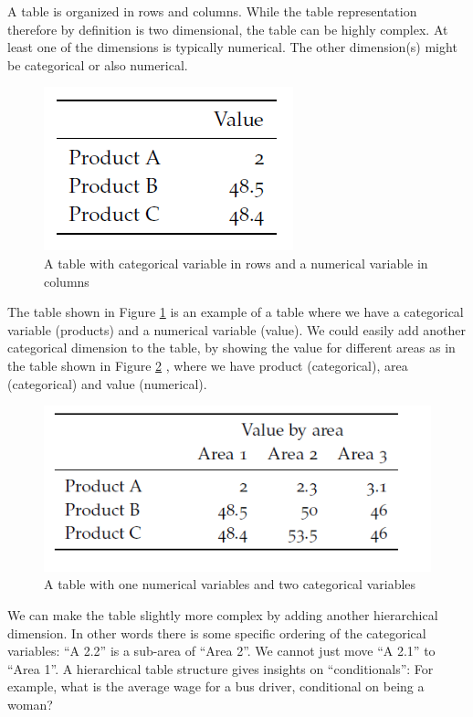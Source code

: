 \documentclass[]{book}
\begin{document}
A table is organized in rows and columns. While the table representation therefore by definition is two dimensional, the table can be highly complex. At least one of the dimensions is typically numerical. The other dimension(s) might be categorical or also numerical.

\begin{figure}

{\centering \includegraphics[width=0.3\linewidth]{_resources/chapter_viz/tab1} 

}

\caption{A table with categorical variable in rows and a numerical variable in columns}\label{fig:viz5}
\end{figure}

The table shown in Figure \ref{fig:viz5} is an example of a table where we have a categorical variable (products) and a numerical variable (value). We could easily add another categorical dimension to the table, by showing the value for different areas as in the table shown in Figure \ref{fig:viz6} , where we have product (categorical), area (categorical) and value (numerical).

\begin{figure}

{\centering \includegraphics[width=0.6\linewidth]{_resources/chapter_viz/tab2} 

}

\caption{A table with one numerical variables and two categorical variables}\label{fig:viz6}
\end{figure}

We can make the table slightly more complex by adding another hierarchical dimension. In other words there is some specific ordering of the categorical variables: ``A 2.2'' is a sub-area of ``Area 2''. We cannot just move ``A 2.1'' to ``Area 1''. A hierarchical table structure gives insights on ``conditionals'': For example, what is the average wage for a bus driver, conditional on being a woman?
\end{document}
